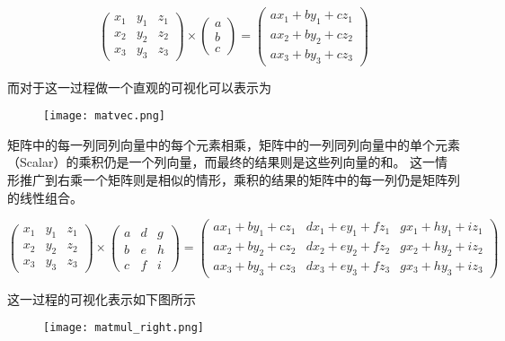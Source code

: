 \begin{equation}
  \begin{pmatrix}
    x_1 & y_1 & z_1\\
    x_2 & y_2 & z_2\\  
    x_3 & y_3 & z_3
  \end{pmatrix}
  \times 
  \begin{pmatrix}
    a \\
    b \\
    c
  \end{pmatrix}
  = 
  \begin{pmatrix}
    ax_1 + by_1 + cz_1\\
    ax_2 + by_2 + cz_2\\  
    ax_3 + by_3 + cz_3
  \end{pmatrix}
\end{equation}

而对于这一过程做一个直观的可视化可以表示为

\begin{figure}
  \texttt{[image: matvec.png]}
\end{figure}

矩阵中的每一列同列向量中的每个元素相乘，矩阵中的一列同列向量中的单个元素（Scalar）的乘积仍是一个列向量，而最终的结果则是这些列向量的和。
这一情形推广到右乘一个矩阵则是相似的情形，乘积的结果的矩阵中的每一列仍是矩阵列的线性组合。

\begin{equation}
  \begin{pmatrix}
    x_1 & y_1 & z_1\\
    x_2 & y_2 & z_2\\  
    x_3 & y_3 & z_3
  \end{pmatrix}
  \times 
  \begin{pmatrix}
    a & d & g\\
    b & e & h\\
    c & f & i
  \end{pmatrix}
  = 
  \begin{pmatrix}
    ax_1 + by_1 + cz_1 & dx_1 + ey_1 + fz_1 & gx_1 + hy_1 + iz_1 \\
    ax_2 + by_2 + cz_2 & dx_2 + ey_2 + fz_2 & gx_2 + hy_2 + iz_2 \\
    ax_3 + by_3 + cz_3 & dx_3 + ey_3 + fz_3 & gx_3 + hy_3 + iz_3
  \end{pmatrix}
\end{equation}

这一过程的可视化表示如下图所示

\begin{figure}
  \texttt{[image: matmul\_right.png]}
\end{figure}

